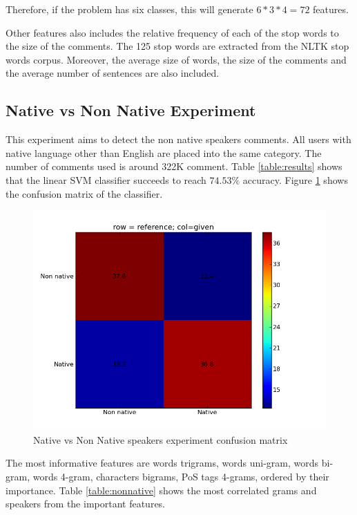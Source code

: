 \documentclass[11pt]{article}
\begin{document}
Therefore, if the problem has six classes, this will generate $6*3*4 = 72$ features.

Other features also includes the relative frequency of each of the stop words to the size of the comments. The 125 stop words are extracted from the NLTK stop words corpus. Moreover, the average size of words, the size of the comments and the average number of sentences are also included.


\subsection{Native vs Non Native Experiment}
This experiment aims to detect the non native speakers comments. All users with native language other than English are placed into the same category. The number of comments used is around 322K comment. Table \ref{table:results} shows that the linear SVM classifier succeeds to reach $74.53\%$ accuracy. Figure \ref{non_cfm} shows the confusion matrix of the classifier.


\begin{figure}[htp]
\centering
\includegraphics[scale=0.45]{native_cfm.png}
\caption{Native vs Non Native speakers experiment confusion matrix}
\label{non_cfm}
\end{figure}


The most informative features are words trigrams, words uni-gram, words bi-gram, words 4-gram, characters bigrams, PoS tags 4-grams, ordered by their importance. Table \ref{table:nonnative} shows the most correlated grams and speakers from the important features.
\end{document}
